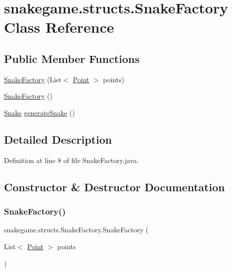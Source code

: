 \hypertarget{classsnakegame_1_1structs_1_1_snake_factory}{}\section{snakegame.\+structs.\+Snake\+Factory Class Reference}
\label{classsnakegame_1_1structs_1_1_snake_factory}
\subsection*{Public Member Functions}
\begin{DoxyCompactItemize}
\item 
\mbox{\hyperlink{classsnakegame_1_1structs_1_1_snake_factory_a7554cd7f5aa717667f3babe46e896cda}{Snake\+Factory}} (List$<$ \mbox{\hyperlink{classsnakegame_1_1structs_1_1_point}{Point}} $>$ points)
\item 
\mbox{\hyperlink{classsnakegame_1_1structs_1_1_snake_factory_a057bbfab734e3434b03c8fe9b6ea7129}{Snake\+Factory}} ()
\item 
\mbox{\hyperlink{classsnakegame_1_1structs_1_1_snake}{Snake}} \mbox{\hyperlink{classsnakegame_1_1structs_1_1_snake_factory_aaa009e01befdc963fbe8b920dc1ef97e}{generate\+Snake}} ()
\end{DoxyCompactItemize}


\subsection{Detailed Description}


Definition at line 8 of file Snake\+Factory.\+java.



\subsection{Constructor \& Destructor Documentation}
\mbox{\label{classsnakegame_1_1structs_1_1_snake_factory_a7554cd7f5aa717667f3babe46e896cda}} 
\subsubsection{\texorpdfstring{Snake\+Factory()}{SnakeFactory()}\hspace{0.1cm}{\footnotesize\ttfamily [1/2]}}
{\footnotesize\ttfamily snakegame.\+structs.\+Snake\+Factory.\+Snake\+Factory (\begin{DoxyParamCaption}\item[{List$<$ \mbox{\hyperlink{classsnakegame_1_1structs_1_1_point}{Point}} $>$}]{points }\end{DoxyParamCaption})}



